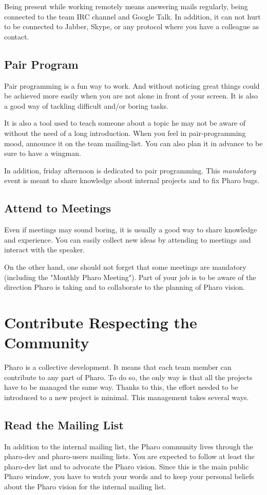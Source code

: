 \documentclass[10pt]{article}
\begin{document}
Being present while working remotely means answering mails regularly, being connected to the team IRC channel and Google Talk. In addition, it can not hurt to be connected to Jabber, Skype, or any protocol where you have a colleague as contact.

\subsection{Pair Program}
Pair programming is a fun way to work. And without noticing great things could be achieved more easily when you are not alone in front of your screen. It is also a good way of tackling difficult and/or boring tasks.

It is also a tool used to teach someone about a topic he may not be aware of without the need of a long introduction. When you feel in pair-programming mood, announce it on the team mailing-list. You can also plan it in advance to be sure to have a wingman.

In addition, friday afternoon is dedicated to pair programming. This \emph{mandatory} event is meant to share knowledge about internal projects and to fix Pharo bugs.

\subsection{Attend to Meetings}
Even if meetings may sound boring, it is usually a good way to share knowledge and experience.
You can easily collect new ideas by attending to meetings and interact with the speaker.

On the other hand, one should not forget that some meetings are mandatory (including the "Monthly Pharo Meeting").
Part of your job is to be aware of the direction Pharo is taking and to collaborate to the planning of Pharo vision. 

\section{Contribute Respecting the Community}
Pharo is a collective development. It means that each team member can contribute to any part of Pharo.
To do so, the only way is that all the projects have to be managed the same way.
Thanks to this, the effort needed to be introduced to a new project is minimal.
This management takes several ways.

\subsection{Read the Mailing List}
In addition to the internal mailing list, the Pharo community lives through the pharo-dev and pharo-users mailing lists. You are expected to follow at least the pharo-dev list and to advocate the Pharo vision. Since this is the main public Pharo window, you have to watch your words and to keep your personal beliefs about the Pharo vision for the internal mailing list. 
\end{document}
